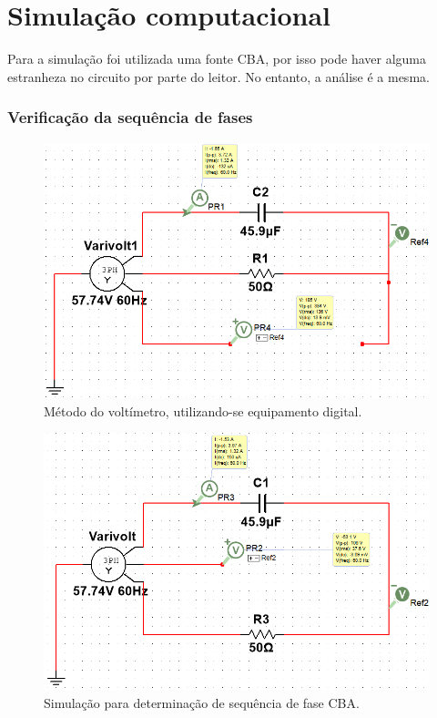 \documentclass[a4paper,12pt,oneside,openany,table,xcdraw]{article}
\begin{document}
\vspace{1cm}
\section{Simulação computacional} %
Para a simulação foi utilizada uma fonte CBA, por isso pode haver alguma estranheza no circuito por parte do leitor. No entanto, a análise é a mesma.
\vspace{0.2cm}

\subsubsection{Verificação da sequência de fases}

\begin{figure}[H]
\centering
\includegraphics[width=13cm]{m1-sim-abc}
\caption{Método do voltímetro, utilizando-se equipamento digital.}
\label{m1:sim:abc}
\end{figure}

\vspace{0.2cm}
\begin{figure}[H]
\centering
\includegraphics[width=13cm]{m1-sim-cba}
\caption{Simulação para determinação de sequência de fase CBA.}
\label{m1:sim:cba}
\end{figure}
\end{document}
